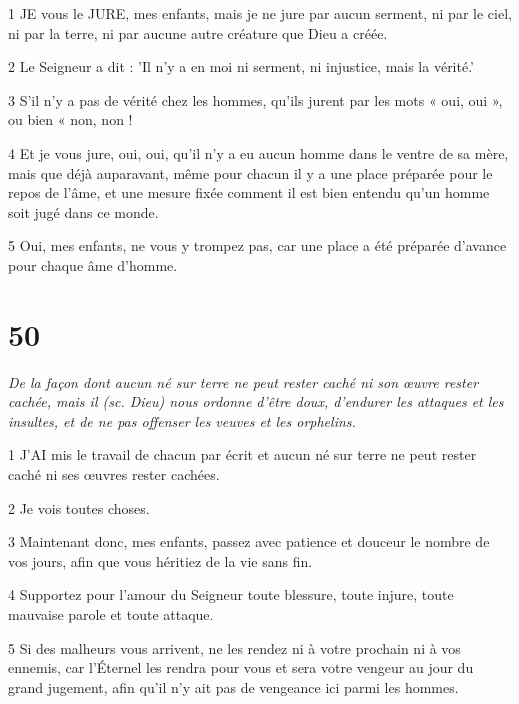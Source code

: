 \par 1 JE vous le JURE, mes enfants, mais je ne jure par aucun serment, ni par le ciel, ni par la terre, ni par aucune autre créature que Dieu a créée.

\par 2 Le Seigneur a dit : 'Il n'y a en moi ni serment, ni injustice, mais la vérité.'

\par 3 S'il n'y a pas de vérité chez les hommes, qu'ils jurent par les mots « oui, oui », ou bien « non, non !

\par 4 Et je vous jure, oui, oui, qu'il n'y a eu aucun homme dans le ventre de sa mère, mais que déjà auparavant, même pour chacun il y a une place préparée pour le repos de l'âme, et une mesure fixée comment il est bien entendu qu'un homme soit jugé dans ce monde.

\par 5 Oui, mes enfants, ne vous y trompez pas, car une place a été préparée d'avance pour chaque âme d'homme.

\chapter{50}

\par \textit{De la façon dont aucun né sur terre ne peut rester caché ni son œuvre rester cachée, mais il (sc. Dieu) nous ordonne d'être doux, d'endurer les attaques et les insultes, et de ne pas offenser les veuves et les orphelins.}

\par 1 J'AI mis le travail de chacun par écrit et aucun né sur terre ne peut rester caché ni ses œuvres rester cachées.

\par 2 Je vois toutes choses.

\par 3 Maintenant donc, mes enfants, passez avec patience et douceur le nombre de vos jours, afin que vous héritiez de la vie sans fin.

\par 4 Supportez pour l'amour du Seigneur toute blessure, toute injure, toute mauvaise parole et toute attaque.

\par 5 Si des malheurs vous arrivent, ne les rendez ni à votre prochain ni à vos ennemis, car l'Éternel les rendra pour vous et sera votre vengeur au jour du grand jugement, afin qu'il n'y ait pas de vengeance ici parmi les hommes.

